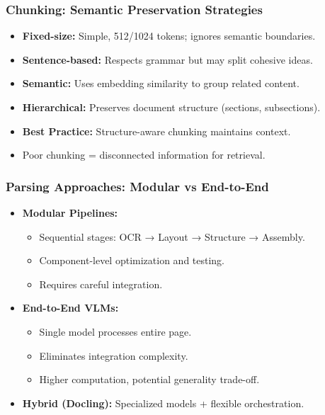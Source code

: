 \begin{frame}[fragile]\frametitle{Chunking: Semantic Preservation Strategies}
      \begin{itemize}
        \item \textbf{Fixed-size:} Simple, 512/1024 tokens; ignores semantic boundaries.
        \item \textbf{Sentence-based:} Respects grammar but may split cohesive ideas.
        \item \textbf{Semantic:} Uses embedding similarity to group related content.
        \item \textbf{Hierarchical:} Preserves document structure (sections, subsections).
        \item \textbf{Best Practice:} Structure-aware chunking maintains context.
        \item Poor chunking = disconnected information for retrieval.
      \end{itemize}
\end{frame}

\begin{frame}[fragile]\frametitle{Parsing Approaches: Modular vs End-to-End}
      \begin{itemize}
        \item \textbf{Modular Pipelines:}
        \begin{itemize}
          \item Sequential stages: OCR → Layout → Structure → Assembly.
          \item Component-level optimization and testing.
          \item Requires careful integration.
        \end{itemize}
        \item \textbf{End-to-End VLMs:}
        \begin{itemize}
          \item Single model processes entire page.
          \item Eliminates integration complexity.
          \item Higher computation, potential generality trade-off.
        \end{itemize}
        \item \textbf{Hybrid (Docling):} Specialized models + flexible orchestration.
      \end{itemize}
\end{frame}

